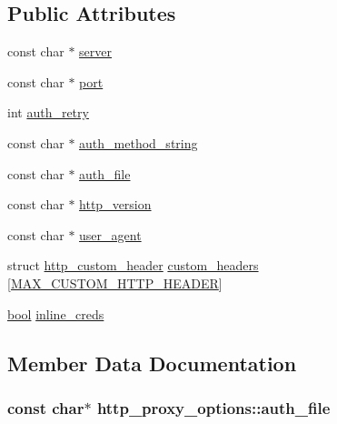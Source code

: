 \subsection*{Public Attributes}
\begin{DoxyCompactItemize}
\item 
const char $\ast$ \hyperlink{structhttp__proxy__options_afa4d014cd5174ce3cc82947c54be8a54}{server}
\item 
const char $\ast$ \hyperlink{structhttp__proxy__options_a5eec9078cb40b9e5839f7322a9f25b8b}{port}
\item 
int \hyperlink{structhttp__proxy__options_ab231c657d09bf5f0842af2d408dc3135}{auth\+\_\+retry}
\item 
const char $\ast$ \hyperlink{structhttp__proxy__options_aba0685c6b222bbd09f13b5a1588d0396}{auth\+\_\+method\+\_\+string}
\item 
const char $\ast$ \hyperlink{structhttp__proxy__options_a45c77c92c55bef40580c8bce5b2add73}{auth\+\_\+file}
\item 
const char $\ast$ \hyperlink{structhttp__proxy__options_a4e0ccf96b14cb5f21944224586b640b0}{http\+\_\+version}
\item 
const char $\ast$ \hyperlink{structhttp__proxy__options_aa6f43a5c86de2e47e6d3512b765e1ea7}{user\+\_\+agent}
\item 
struct \hyperlink{structhttp__custom__header}{http\+\_\+custom\+\_\+header} \hyperlink{structhttp__proxy__options_adc7c72951f926ffe5b1d8f37bc8fdf59}{custom\+\_\+headers} \mbox{[}\hyperlink{proxy_8h_a1cc6cc2b8aebc77dbf7c535a8af630ef}{M\+A\+X\+\_\+\+C\+U\+S\+T\+O\+M\+\_\+\+H\+T\+T\+P\+\_\+\+H\+E\+A\+D\+E\+R}\mbox{]}
\item 
\hyperlink{automatic_8c_abb452686968e48b67397da5f97445f5b}{bool} \hyperlink{structhttp__proxy__options_a9f69ad3374ce517f81591ba8a2094921}{inline\+\_\+creds}
\end{DoxyCompactItemize}


\subsection{Member Data Documentation}
\hypertarget{structhttp__proxy__options_a45c77c92c55bef40580c8bce5b2add73}{}
\subsubsection[{auth\+\_\+file}]{\setlength{\rightskip}{0pt plus 5cm}const char$\ast$ http\+\_\+proxy\+\_\+options\+::auth\+\_\+file}\label{structhttp__proxy__options_a45c77c92c55bef40580c8bce5b2add73}
\hypertarget{structhttp__proxy__options_aba0685c6b222bbd09f13b5a1588d0396}{}
